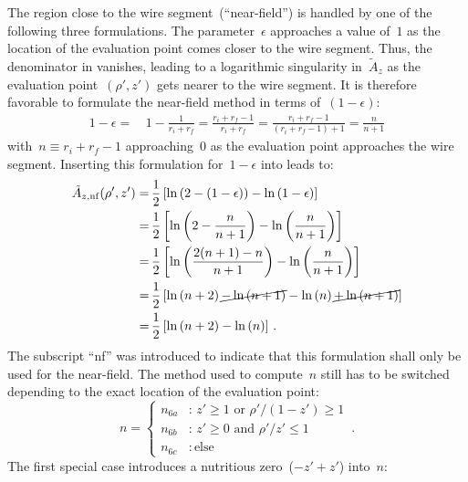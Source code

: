 The region close to the wire segment~(``near-field'') is handled by one of the following three formulations.
The parameter~$\epsilon$ approaches a value of~$1$ as the location of the evaluation point comes closer to the wire segment.
Thus, the denominator in  vanishes, leading to a logarithmic singularity in~$\tilde{A}_z$
as the evaluation point~$(\rho', z')$ gets nearer to the wire segment.
It is therefore favorable to formulate the near-field method in terms of~$(1-\epsilon)$:
\begin{align}
  1-\epsilon =&\, 1 - \frac{1}{r_i + r_f} = \frac{r_i + r_f - 1}{r_i + r_f} = \frac{r_i + r_f - 1}{(r_i + r_f - 1) + 1} = \frac{n}{n + 1}
\end{align}
with~$n \equiv r_i + r_f - 1$ approaching~$0$ as the evaluation point approaches the wire segment.
Inserting this formulation for~$1-\epsilon$ into  leads to:
\begin{align}
  \tilde{A}_{z,\mathrm{nf}} (\rho', z')
  =&\, \frac{1}{2}  \left[ \ln\left(2 - (1-\epsilon)        \right) - \ln \left(1 - \epsilon    \right) \right] \nonumber \\
  =&\, \frac{1}{2}  \left[ \ln\left(2 - \frac{n}{n + 1}     \right) - \ln \left(\frac{n}{n + 1} \right) \right] \nonumber \\
  =&\, \frac{1}{2}  \left[ \ln\left(\frac{2(n+1) - n}{n + 1}\right) - \ln \left(\frac{n}{n + 1} \right) \right] \nonumber \\
  =&\, \frac{1}{2}  \left[ \ln\left(n + 2                   \right) \cancel{- \ln\left(n + 1 \right)} - \ln \left( n \right) \cancel{+ \ln \left( n + 1 \right)} \right] \nonumber \\
  =&\, \frac{1}{2}  \left[ \ln\left(n + 2                   \right) - \ln \left( n \right) \right] \, .
\end{align}
The subscript ``nf'' was introduced to indicate that this formulation shall only be used for the near-field.
The method used to compute~$n$ still has to be switched depending to the exact location of the evaluation point:
\begin{equation}
  n = \begin{cases}
        n_{6a} &:\, z' \geq 1 \textrm{ or } \rho'/(1-z') \geq 1 \\
        n_{6b} &:\, z' \geq 0 \textrm{ and } \rho'/z' \leq 1 \\
        n_{6c} &:\, \textrm{else}
      \end{cases} \, .
\end{equation}
The first special case introduces a nutritious zero~($-z' + z'$) into~$n$:

